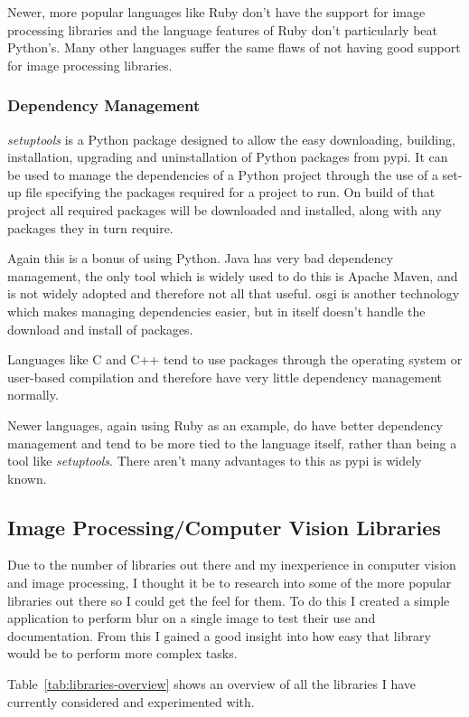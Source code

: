 Newer, more popular languages like Ruby don't have the support for image processing libraries and
the language features of Ruby don't particularly beat Python's. Many other languages suffer the
same flaws of not having good support for image processing libraries.

\subsubsection{Dependency Management}
\emph{setuptools} is a Python package designed to allow the easy downloading, building, 
installation, upgrading and uninstallation of Python packages from \gls{pypi}. It can be used to
manage the dependencies of a Python project through the use of a set-up file specifying the 
packages required for a project to run. On build of that project all required packages will be 
downloaded and installed, along with any packages they in turn require.

Again this is a bonus of using Python. Java has very bad dependency management, the only tool
which is widely used to do this is Apache Maven, and is not widely adopted and therefore not all
that useful. \Gls{osgi} is another technology which makes managing dependencies easier, but in 
itself doesn't handle the download and install of packages.

Languages like C and C++ tend to use packages through the operating system or user-based 
compilation and therefore have very little dependency management normally.

Newer languages, again using Ruby as an example, do have better dependency management and tend to
be more tied to the language itself, rather than being a tool like \emph{setuptools}. There aren't
many advantages to this as \gls{pypi} is widely known.

\subsection{Image Processing/Computer Vision Libraries}
Due to the number of libraries out there and my inexperience in computer vision and image 
processing, I thought it be to research into some of the more popular libraries out there so I
could get the feel for them. To do this I created a simple application to  perform blur on a 
single image to test their use and documentation. From this I gained a good insight into how easy 
that library would be to perform more complex tasks.

Table~\ref{tab:libraries-overview} shows an overview of all the libraries I have currently 
considered and experimented with.

